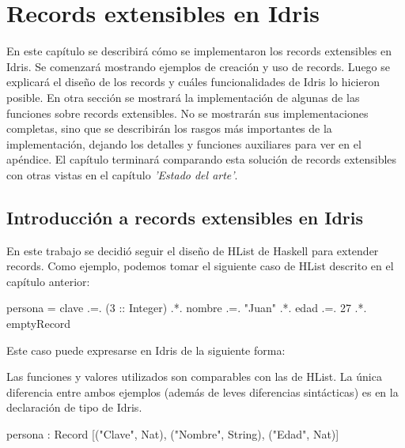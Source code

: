 
\chapter{Records extensibles en Idris}
\label{ch:3}

En este capítulo se describirá cómo se implementaron los records extensibles en Idris. Se comenzará mostrando ejemplos de creación y uso de records. Luego se explicará el diseño de los records y cuáles funcionalidades de Idris lo hicieron posible. En otra sección se mostrará la implementación de algunas de las funciones sobre records extensibles. No se mostrarán sus implementaciones completas, sino que se describirán los rasgos más importantes de la implementación, dejando los detalles y funciones auxiliares para ver en el apéndice. El capítulo terminará comparando esta solución de records extensibles con otras vistas en el capítulo \textit{'Estado del arte'}.

\section{Introducción a records extensibles en Idris}

En este trabajo se decidió seguir el diseño de HList de Haskell para extender records. Como ejemplo, podemos tomar el siguiente caso de HList descrito en el capítulo anterior:

\begin{code}
persona = clave .=. (3 :: Integer)
  .*. nombre .=. "Juan"
  .*. edad .=. 27
  .*. emptyRecord
\end{code}

Este caso puede expresarse en Idris de la siguiente forma:


Las funciones y valores utilizados son comparables con las de HList. La única diferencia entre ambos ejemplos (además de leves diferencias sintácticas) es en la declaración de tipo de Idris.

\begin{code}
persona : Record [("Clave", Nat), ("Nombre", String),
  ("Edad", Nat)]
\end{code}

